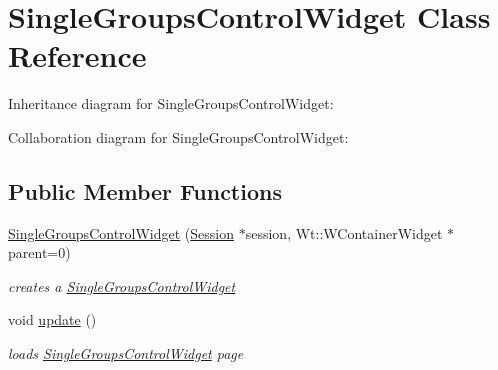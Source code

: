 \hypertarget{classSingleGroupsControlWidget}{}\section{Single\+Groups\+Control\+Widget Class Reference}
\label{classSingleGroupsControlWidget}


Inheritance diagram for Single\+Groups\+Control\+Widget\+:


Collaboration diagram for Single\+Groups\+Control\+Widget\+:
\subsection*{Public Member Functions}
\begin{DoxyCompactItemize}
\item 
\hyperlink{classSingleGroupsControlWidget_a49e2f9e4c74289cf0d3167283e14fded}{Single\+Groups\+Control\+Widget} (\hyperlink{classSession}{Session} $\ast$session, Wt\+::\+W\+Container\+Widget $\ast$parent=0)
\begin{DoxyCompactList}\small\item\em creates a \hyperlink{classSingleGroupsControlWidget}{Single\+Groups\+Control\+Widget} \end{DoxyCompactList}\item 
void \hyperlink{classSingleGroupsControlWidget_ab6eea77943da3ae94d43764d2a5a4aed}{update} ()
\begin{DoxyCompactList}\small\item\em loads \hyperlink{classSingleGroupsControlWidget}{Single\+Groups\+Control\+Widget} page \end{DoxyCompactList}\end{DoxyCompactItemize}
